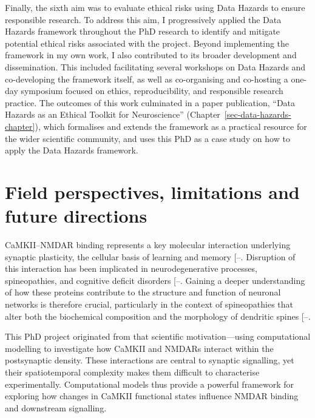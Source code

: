 \documentclass[
  11pt,
  letterpaper,
]{scrreprt}
\begin{document}
Finally, the sixth aim was to evaluate ethical risks using Data Hazards
to ensure responsible research. To address this aim, I progressively
applied the Data Hazards framework throughout the PhD research to
identify and mitigate potential ethical risks associated with the
project. Beyond implementing the framework in my own work, I also
contributed to its broader development and dissemination. This included
facilitating several workshops on Data Hazards and co-developing the
framework itself, as well as co-organising and co-hosting a one-day
symposium focused on ethics, reproducibility, and responsible research
practice. The outcomes of this work culminated in a paper publication,
``Data Hazards as an Ethical Toolkit for Neuroscience''
(Chapter~\ref{sec-data-hazards-chapter}), which formalises and extends
the framework as a practical resource for the wider scientific
community, and uses this PhD as a case study on how to apply the Data
Hazards framework.


\chapter{Field perspectives, limitations and future
directions}\label{sec-discussion}

CaMKII--NMDAR binding represents a key molecular interaction underlying
synaptic plasticity, the cellular basis of learning and memory
{[}--\citeproc{ref-bayer2024Revised}{11}{]}.
Disruption of this interaction has been implicated in neurodegenerative
processes, spineopathies, and cognitive deficit disorders
{[}--\citeproc{ref-yang2023NMDA}{8}{]}.
Gaining a deeper understanding of how these proteins contribute to the
structure and function of neuronal networks is therefore crucial,
particularly in the context of spineopathies that alter both the
biochemical composition and the morphology of dendritic spines
{[}--\citeproc{ref-yasuda2017Biophysics}{15}{]}.

This PhD project originated from that scientific motivation---using
computational modelling to investigate how CaMKII and NMDARs interact
within the postsynaptic density. These interactions are central to
synaptic signalling, yet their spatiotemporal complexity makes them
difficult to characterise experimentally. Computational models thus
provide a powerful framework for exploring how changes in CaMKII
functional states influence NMDAR binding and downstream signalling.
\end{document}
